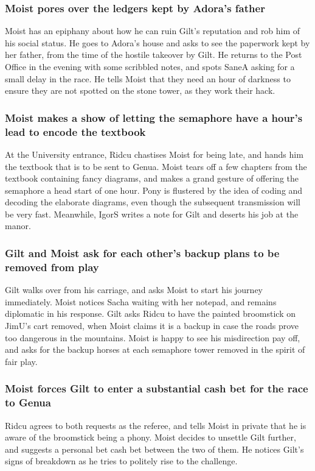 \subsubsection{\Gls{Moist} pores over the ledgers kept by \Gls{Adora}'s father}
\Gls{Moist} has an epiphany about how he can ruin \Gls{Gilt}'s reputation and rob him of his
social status. He goes to \Gls{Adora}'s house and asks to see the paperwork kept by her father, from
the time of the hostile takeover by \Gls{Gilt}. He returns to the Post Office in the evening with
some scribbled notes, and spots \Gls{SaneA} asking for a small delay in the race. He tells
\Gls{Moist} that they need an hour of darkness to ensure they are not spotted on the stone tower,
as they work their hack.

\subsubsection{\Gls{Moist} makes a show of letting the semaphore have a hour's lead to encode the
    textbook}
At the University entrance, \Gls{Ridcu} chastises \Gls{Moist} for being late, and hands him the
textbook that is to be sent to Genua. \Gls{Moist} tears off a few chapters from the textbook
containing fancy diagrams, and makes a grand gesture of offering the semaphore a head start of one
hour. \Gls{Pony} is flustered by the idea of coding and decoding the elaborate diagrams, even
though the subsequent transmission will be very fast. Meanwhile, \Gls{IgorS} writes a note for
\Gls{Gilt} and deserts his job at the manor.

\subsubsection{\Gls{Gilt} and \Gls{Moist} ask for each other's backup plans to be removed from play}
\Gls{Gilt} walks over from his carriage, and asks \Gls{Moist} to start his journey immediately.
\Gls{Moist} notices \Gls{Sacha} waiting with her notepad, and remains diplomatic in his response.
\Gls{Gilt} asks \Gls{Ridcu} to have the painted broomstick on \Gls{JimU}'s cart removed, when
\Gls{Moist} claims it is a backup in case the roads prove too dangerous in the mountains.
\Gls{Moist} is happy to see his misdirection pay off, and asks for the backup horses at each
semaphore tower removed in the spirit of fair play.

\subsubsection{\Gls{Moist} forces \Gls{Gilt} to enter a substantial cash bet for the race to Genua}
\Gls{Ridcu} agrees to both requests as the referee, and tells \Gls{Moist} in private that he is
aware of the broomstick being a phony. \Gls{Moist} decides to unsettle \Gls{Gilt} further, and
suggests a personal bet cash bet between the two of them. He notices \Gls{Gilt}'s signs of breakdown
as he tries to politely rise to the challenge.

